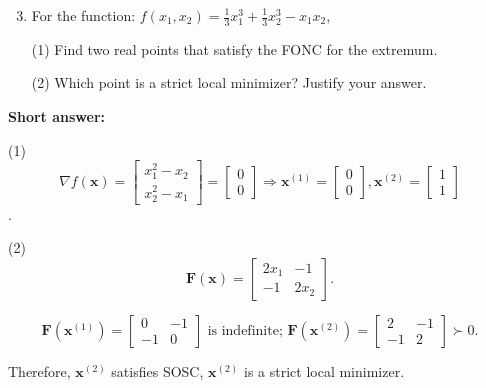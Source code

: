 \medskip
\noindent
\begin{enumerate}
	\setcounter{enumi}{2}
	
	\item For the function: \(f\left(x_{1}, x_{2}\right)=\frac{1}{3} x_{1}^{3}+\frac{1}{3} x_{2}^{3}-x_{1} x_{2}\),

	(1) Find two real points that satisfy the FONC for the extremum.
	
	(2) Which point is a strict local minimizer? Justify your answer.

\end{enumerate}

\textbf{Short answer:}

(1) \[\nabla f(\boldsymbol{x})=\left[\begin{array}{l}x_{1}^{2}-x_{2} \\ x_{2}^{2}-x_{1}\end{array}\right]=\left[\begin{array}{l}0 \\ 0\end{array}\right] \Rightarrow \boldsymbol{x}^{(1)}=\left[\begin{array}{l}0 \\ 0\end{array}\right], \boldsymbol{x}^{(2)}=\left[\begin{array}{l}1 \\ 1\end{array}\right]\].

(2) \[\boldsymbol{F} (\boldsymbol{x})=\left[\begin{array}{cc}2 x_{1} & -1 \\ -1 & 2 x_{2}\end{array}\right].\]

\[
\boldsymbol{F} \left(\boldsymbol{x}^{(1)}\right)=\left[\begin{array}{cc}0 & -1 \\ -1 & 0  \end{array}\right] \text{ is indefinite; } \boldsymbol{F} \left(\boldsymbol{x}^{(2)}\right)=\left[\begin{array}{cc}2 & -1 \\ -1 & 2 \end{array}\right] \succ 0.
\]

Therefore, \(\boldsymbol{x}^{(2)}\) satisfies SOSC, \(\boldsymbol{x}^{(2)}\) is a strict local minimizer.
